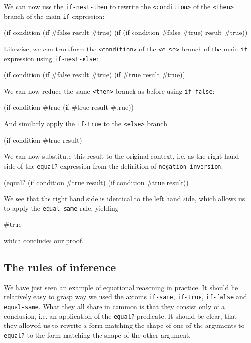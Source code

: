 We can now use the \texttt{if-nest-then} to rewrite the \texttt{<condition>}
of the \texttt{<then>} branch of the main \texttt{if} expression:

\begin{Snippet}
  (if condition
      (if #false result #true)
      (if (if condition #false #true) result #true))
\end{Snippet}

Likewise, we can transform the \texttt{<condition>} of the
\texttt{<else>} branch of the main \texttt{if} expression using
\texttt{if-nest-else}:

\begin{Snippet}
  (if condition
      (if #false result #true)
      (if #true result #true))
\end{Snippet}

We can now reduce the same \texttt{<then>} branch as before
using \texttt{if-false}:

\begin{Snippet}
  (if condition
      #true
      (if #true result #true))
\end{Snippet}

And similarly apply the \texttt{if-true} to the \texttt{<else>}
branch

\begin{Snippet}
  (if condition
      #true
      result)
\end{Snippet}

We can now substitute this result to the original context, i.e.
as the right hand side of the \texttt{equal?} expression from
the definition of \texttt{negation-inversion}:

\begin{Snippet}
  (equal? (if condition #true result)
          (if condition #true result))
\end{Snippet}

We see that the right hand side is identical to the left hand side,
which allows us to apply the \texttt{equal-same} rule, yielding

\begin{Snippet}
  #true
\end{Snippet}

which concludes our proof.

\subsection{The rules of inference}

We have just seen an example of equational reasoning in practice.
It should be relatively easy to grasp way we used the axioms
\texttt{if-same}, \texttt{if-true}, \texttt{if-false} and
\texttt{equal-same}. What they all share in common is that they
consist only of a conclusion, i.e. an application of
the \texttt{equal?} predicate. It should
be clear, that they allowed us to rewrite a form matching the shape
of one of the arguments to \texttt{equal?} to the form matching
the shape of the other argument.

